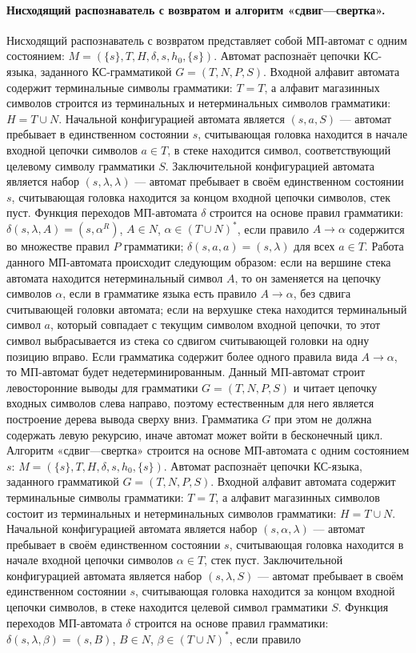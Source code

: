 \documentclass[a4paper,12pt]{article}
\begin{document}
\paragraph{Нисходящий распознаватель с возвратом и алгоритм «сдвиг—свертка».}
Нисходящий распознаватель с возвратом представляет собой МП-автомат с одним состоянием: \(M=(\{s\},T,H,\delta,s,h_0,\{s\})\). Автомат распознаёт цепочки КС-языка, заданного КС-грамматикой \(G=(T,N,P,S)\). Входной алфавит автомата содержит терминальные символы грамматики: \(T=T\), а алфавит магазинных символов строится из терминальных и нетерминальных символов грамматики: \(H=T\cup N\). Начальной конфигурацией автомата является \((s,a,S)\) — автомат пребывает в единственном состоянии \(s\), считывающая головка находится в начале входной цепочки символов \(a\in T\), в стеке находится символ, соответствующий целевому символу грамматики \(S\). Заключительной конфигурацией автомата является набор \((s,\lambda,\lambda)\) — автомат пребывает в своём единственном состоянии \(s\), считывающая головка находится за концом входной цепочки символов, стек пуст. Функция переходов МП-автомата \(\delta\) строится на основе правил грамматики: \(\delta(s,\lambda,A)=(s,\alpha^R)\), \(A\in N\), \(\alpha\in(T\cup N)^*\), если правило \(A\to\alpha\) содержится во множестве правил \(P\) грамматики; \(\delta(s,a,a)=(s,\lambda)\) для всех \(a\in T\). Работа данного МП-автомата происходит следующим образом: если на вершине стека автомата находится нетерминальный символ \(A\), то он заменяется на цепочку символов \(\alpha\), если в грамматике языка есть правило \(A\to\alpha\), без сдвига считывающей головки автомата; если на верхушке стека находится терминальный символ \(a\), который совпадает с текущим символом входной цепочки, то этот символ выбрасывается из стека со сдвигом считывающей головки на одну позицию вправо. Если грамматика содержит более одного правила вида \(A\to\alpha\), то МП-автомат будет недетерминированным. Данный МП-автомат строит левосторонние выводы для грамматики \(G=(T,N,P,S)\) и читает цепочку входных символов слева направо, поэтому естественным для него является построение дерева вывода сверху вниз. Грамматика \(G\) при этом не должна содержать левую рекурсию, иначе автомат может войти в бесконечный цикл. Алгоритм «сдвиг—свертка» строится на основе МП-автомата с одним состоянием \(s\): \(M=(\{s\},T,H,\delta,s,h_0,\{s\})\). Автомат распознаёт цепочки КС-языка, заданного грамматикой \(G=(T,N,P,S)\). Входной алфавит автомата содержит терминальные символы грамматики: \(T=T\), а алфавит магазинных символов состоит из терминальных и нетерминальных символов грамматики: \(H=T\cup N\). Начальной конфигурацией автомата является набор \((s,\alpha,\lambda)\) — автомат пребывает в своём единственном состоянии \(s\), считывающая головка находится в начале входной цепочки символов \(\alpha\in T\), стек пуст. Заключительной конфигурацией автомата является набор \((s,\lambda,S)\) — автомат пребывает в своём единственном состоянии \(s\), считывающая головка находится за концом входной цепочки символов, в стеке находится целевой символ грамматики \(S\). Функция переходов МП-автомата \(\delta\) строится на основе правил грамматики: \(\delta(s,\lambda,\beta)=(s,B)\), \(B\in N\), \(\beta\in(T\cup N)^*\), если правило 
\end{document}
